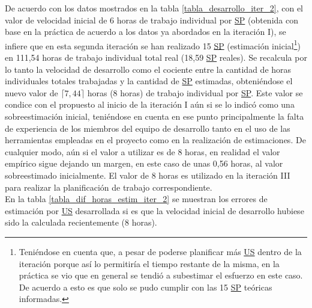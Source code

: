\documentclass[a4paper, 12pt,twoside]{report}  %
\numberwithin{equation}{subsection} %
\begin{document}
De acuerdo con los datos mostrados en la tabla \ref{tabla_desarrollo_iter_2}, con el valor de velocidad inicial de 6 horas de trabajo individual por \hyperlink{SP}{SP} (obtenida con base en la práctica de acuerdo a los datos ya abordados en la iteración I), se infiere que en esta segunda iteración se han realizado 15 \hyperlink{SP}{SP} (estimación inicial\renewcommand*{\thefootnote}{\fnsymbol{footnote}}\footnote[1]{Teniéndose en cuenta que, a pesar de poderse planificar más \hyperlink{US}{US} dentro de la iteración porque así lo permitiría el tiempo restante de la misma, en la práctica se vio que en general se tendió a subestimar el esfuerzo en este caso. De acuerdo a esto es que solo se pudo cumplir con las 15 \hyperlink{SP}{SP} teóricas informadas.}\renewcommand*{\thefootnote}{\arabic{footnote}}) en 111,54 horas de trabajo individual total real (18,59 \hyperlink{SP}{SP} reales). Se recalcula por lo tanto la velocidad de desarrollo como el cociente entre la cantidad de horas individuales totales trabajadas y la cantidad de \hyperlink{SP}{SP} estimadas, obteniéndose el nuevo valor de \begin{math}\lceil 7,44\rceil\end{math} horas (8 horas) de trabajo individual por \hyperlink{SP}{SP}. Este valor se condice con el propuesto al inicio de la iteración I aún si se lo indicó como una sobreestimación inicial, teniéndose en cuenta en ese punto principalmente la falta de experiencia de los miembros del equipo de desarrollo tanto en el uso de las herramientas empleadas en el proyecto como en la realización de estimaciones. De cualquier modo, aún si el valor a utilizar es de 8 horas, en realidad el valor empírico sigue dejando un margen, en este caso de unas 0,56 horas, al valor sobreestimado inicialmente. El valor de 8 horas es utilizado en la iteración III para realizar la planificación de trabajo correspondiente.\\
\indent En la tabla \ref{tabla_dif_horas_estim_iter_2} se muestran los errores de estimación por \hyperlink{US}{US} desarrollada si es que la velocidad inicial de desarrollo hubiese sido la calculada recientemente (8 horas).
\end{document}
